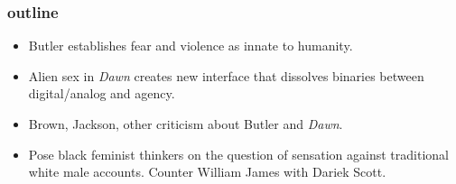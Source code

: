 \documentclass[11pt]{article}
\begin{document}
\subsubsection{outline}
\label{sec:org78d7069}
\begin{itemize}
\item Butler establishes fear and violence as innate to humanity.
\item Alien sex in \emph{Dawn} creates new interface that dissolves binaries
between digital/analog and agency.
\item Brown, Jackson, other criticism about Butler and \emph{Dawn}.
\item Pose black feminist thinkers on the question of sensation against
traditional white male accounts. Counter William James with Dariek
Scott.
\end{itemize}
\end{document}
